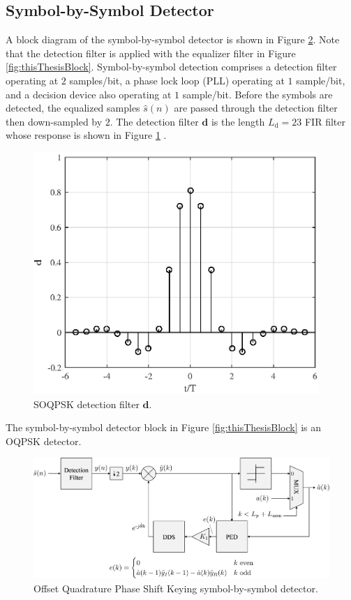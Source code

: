 \subsection{Symbol-by-Symbol Detector}
\label{sec:oqpsk_detector}
A block diagram of the symbol-by-symbol detector is shown in Figure \ref{fig:OQPSK}.
Note that the detection filter is applied with the equalizer filter in Figure \ref{fig:thisThesisBlock}.
Symbol-by-symbol detection comprises a detection filter operating at $2$ samples/bit, a phase lock loop (PLL) operating at $1$ sample/bit, and a decision device also operating at $1$ sample/bit.
Before the symbols are detected, the equalized samples $\hat{s}(n)$ are passed through the detection filter then down-sampled by $2$. 
The detection filter $\mathbf{d}$ is the length $L_\text{d} = 23$ FIR filter whose response is shown in Figure \ref{fig:detectionFilter} \cite[Fig. 3]{perrins:2013}.
\begin{figure}
	\centering\includegraphics[width=4.25in]{figures/eq_equations/df.eps}
	\caption{SOQPSK detection filter $\mathbf{d}$.}
	\label{fig:detectionFilter}
\end{figure}
The symbol-by-symbol detector block in Figure \ref{fig:thisThesisBlock} is an OQPSK detector.
\begin{figure}
	\centering\includegraphics[width=11.83in/100*55]{figures/systemOverview/OQPSK.pdf}
	\caption{Offset Quadrature Phase Shift Keying symbol-by-symbol detector.}
	\label{fig:OQPSK}
\end{figure}

